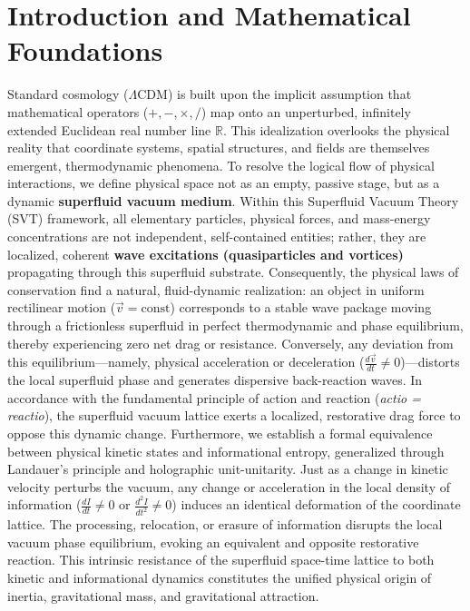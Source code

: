 \documentclass[11pt,a4paper]{article}
\theoremstyle{plain}
\theoremstyle{definition}
\theoremstyle{remark}
\begin{document}
\section{Introduction and Mathematical Foundations}
Standard cosmology ($\Lambda$CDM) is built upon the implicit assumption that mathematical operators ($+, -, \times, /$) map onto an unperturbed, infinitely extended Euclidean real number line $\mathbb{R}$. This idealization overlooks the physical reality that coordinate systems, spatial structures, and fields are themselves emergent, thermodynamic phenomena. To resolve the logical flow of physical interactions, we define physical space not as an empty, passive stage, but as a dynamic \textbf{superfluid vacuum medium}. Within this Superfluid Vacuum Theory (SVT) framework, all elementary particles, physical forces, and mass-energy concentrations are not independent, self-contained entities; rather, they are localized, coherent \textbf{wave excitations (quasiparticles and vortices)} propagating through this superfluid substrate. Consequently, the physical laws of conservation find a natural, fluid-dynamic realization: an object in uniform rectilinear motion ($\vec{v} = \text{const}$) corresponds to a stable wave package moving through a frictionless superfluid in perfect thermodynamic and phase equilibrium, thereby experiencing zero net drag or resistance. Conversely, any deviation from this equilibrium—namely, physical acceleration or deceleration ($\frac{d\vec{v}}{dt} \neq 0$)—distorts the local superfluid phase and generates dispersive back-reaction waves. In accordance with the fundamental principle of action and reaction (\textit{actio = reactio}), the superfluid vacuum lattice exerts a localized, restorative drag force to oppose this dynamic change. Furthermore, we establish a formal equivalence between physical kinetic states and informational entropy, generalized through Landauer's principle and holographic unit-unitarity. Just as a change in kinetic velocity perturbs the vacuum, any change or acceleration in the local density of information ($\frac{dI}{dt} \neq 0$ or $\frac{d^2I}{dt^2} \neq 0$) induces an identical deformation of the coordinate lattice. The processing, relocation, or erasure of information disrupts the local vacuum phase equilibrium, evoking an equivalent and opposite restorative reaction. This intrinsic resistance of the superfluid space-time lattice to both kinetic and informational dynamics constitutes the unified physical origin of inertia, gravitational mass, and gravitational attraction. 
\end{document}
